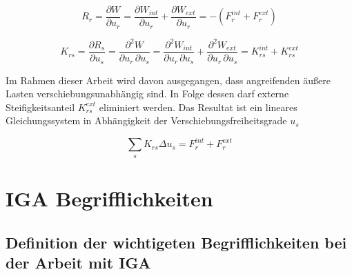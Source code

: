 \documentclass[german,a4paper,12pt,oneside]{scrbook}
\theoremstyle{definition}
\theoremstyle{definition}
\theoremstyle{definition}
\theoremstyle{definition}
\theoremstyle{definition}
\theoremstyle{definition}
\begin{document}
\begin{equation}
    R_r = \frac{\partial W}{\partial u_r} = \frac{\partial W_{int}}{\partial u_r} + \frac{\partial W_{ext}}{\partial u_r} = -(F_{r}^{int} + F_{r}^{ext} )
\end{equation}

\begin{equation}
    K_{rs} = \frac{\partial R_s}{\partial u_s} = 
    \frac{\partial ^2 W}{\partial u_r \, \partial u_s} = 
    \frac{\partial ^2 W_{int}}{\partial u_r \, \partial u_s} + 
    \frac{\partial ^2 W_{ext}}{\partial u_r \, \partial u_s} = 
    K_{rs}^{int} + K_{rs}^{ext}
\end{equation}

\vspace{0.5cm}
Im Rahmen dieser Arbeit wird davon ausgegangen, dass angreifenden äußere Lasten verschiebungsunabhängig sind. In Folge dessen darf externe Steifigkeitsanteil $K_{rs}^{ext}$ eliminiert werden. Das Resultat ist ein lineares Gleichungssystem in Abhängigkeit der Verschiebungsfreiheitsgrade $u_s$ 

\begin{equation}
    \sum_{s} K_{rs} \Delta u_s = F_r^{int} + F_r^{ext}
\end{equation}













\chapter{IGA Begrifflichkeiten}  \setcounter{page}{1}   %

\section{Definition der wichtigeten Begrifflichkeiten bei der Arbeit mit IGA}

\end{document}
